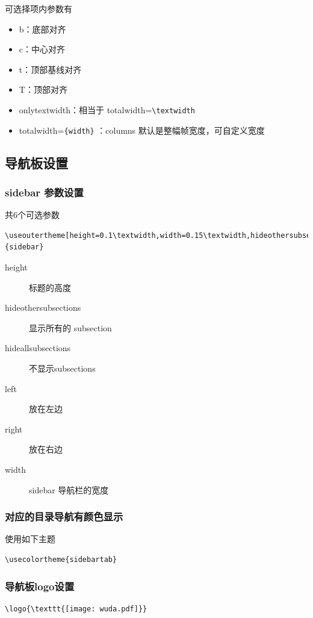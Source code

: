 可选择项内参数有
\begin{itemize}
  \item b：底部对齐
  \item c：中心对齐
  \item t：顶部基线对齐
  \item T：顶部对齐
  \item onlytextwidth：相当于 totalwidth=\verb|\textwidth|
  \item totalwidth=\verb|{width}| ：columns 默认是整幅帧宽度，可自定义宽度
\end{itemize}

\subsection{导航板设置}

\subsubsection{sidebar 参数设置}
共6个可选参数
\scriptsize
\begin{lstlisting}[language={[LaTeX]TeX}]
\useoutertheme[height=0.1\textwidth,width=0.15\textwidth,hideothersubsections,right]{sidebar} \end{lstlisting}
\normalsize
\begin{description}
  \item[height] 标题的高度
  \item[hideothersubsections]  显示所有的 subsection
  \item[hideallsubsections] 不显示subsections
  \item[left] 放在左边
  \item[right] 放在右边
  \item[width] sidebar 导航栏的宽度
\end{description}

\subsubsection{对应的目录导航有颜色显示}
使用如下主题
\begin{lstlisting}[language={[LaTeX]TeX}]
\usecolortheme{sidebartab}
\end{lstlisting}
\subsubsection{导航板logo设置}
\begin{lstlisting}[language={[LaTeX]TeX}]
\logo{\texttt{[image: wuda.pdf]}}
\end{lstlisting}


